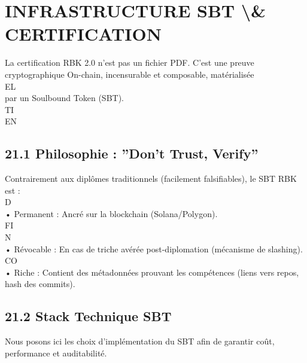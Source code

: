 \section{INFRASTRUCTURE SBT \textbackslash{}& CERTIFICATION}
\vspace{0.5em}
\vspace{0.5em}
La certification RBK 2.0 n’est pas un fichier PDF. C’est une preuve cryptographique On-chain, incensurable et composable, matérialisée\\
\vspace{0.5em}
\vspace{0.5em}
\vspace{0.5em}
\vspace{0.5em}
EL\\
par un Soulbound Token (SBT).\\
\vspace{0.5em}
\vspace{0.5em}
\vspace{0.5em}
\vspace{0.5em}
TI\\
EN\\
\subsection{21.1 Philosophie : ”Don’t Trust, Verify”}
Contrairement aux diplômes traditionnels (facilement falsifiables), le SBT RBK est :\\
\vspace{0.5em}
\vspace{0.5em}
\vspace{0.5em}
\vspace{0.5em}
D\\
• Permanent : Ancré sur la blockchain (Solana/Polygon).\\
\vspace{0.5em}
\vspace{0.5em}
\vspace{0.5em}
FI\\
N\\
• Révocable : En cas de triche avérée post-diplomation (mécanisme de slashing).\\
CO\\
• Riche : Contient des métadonnées prouvant les compétences (liens vers repos, hash des commits).\\
\vspace{0.5em}
\vspace{0.5em}
\subsection{21.2 Stack Technique SBT}
Nous posons ici les choix d’implémentation du SBT afin de garantir coût, performance et auditabilité.\\
\vspace{0.5em}
\vspace{0.5em}
